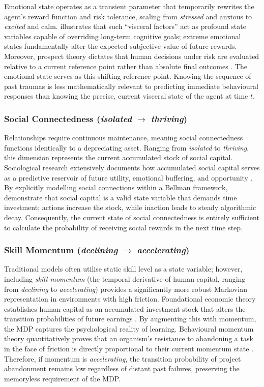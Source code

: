 \documentclass[11pt, a4paper]{article}
\begin{document}
Emotional state operates as a transient parameter that temporarily rewrites the agent's reward
function and risk tolerance, scaling from \textit{stressed} and anxious to \textit{excited}
and calm. \citet{Loewenstein1996} illustrates that such ``visceral factors'' act as profound
state variables capable of overriding long-term cognitive goals; extreme emotional states
fundamentally alter the expected subjective value of future rewards. Moreover, prospect theory
dictates that human decisions under risk are evaluated relative to a current reference point
rather than absolute final outcomes \citep{Kahneman1979}. The emotional state serves as this
shifting reference point. Knowing the sequence of past traumas is less mathematically relevant
to predicting immediate behavioural responses than knowing the precise, current visceral state
of the agent at time $t$.

\subsubsection{Social Connectedness (\textit{isolated} $\rightarrow$ \textit{thriving})}

Relationships require continuous maintenance, meaning social connectedness functions
identically to a depreciating asset. Ranging from \textit{isolated} to \textit{thriving},
this dimension represents the current accumulated stock of social capital. Sociological
research extensively documents how accumulated social capital serves as a predictive reservoir
of future utility, emotional buffering, and opportunity \citep{Putnam2000}. By explicitly
modelling social connections within a Bellman framework, \citet{Glaeser2002} demonstrate that
social capital is a valid state variable that demands time investment; actions increase the
stock, while inaction leads to steady algorithmic decay. Consequently, the current state of
social connectedness is entirely sufficient to calculate the probability of receiving social
rewards in the next time step.

\subsubsection{Skill Momentum (\textit{declining} $\rightarrow$ \textit{accelerating})}

Traditional models often utilise static skill level as a state variable; however, including
\emph{skill momentum} (the temporal derivative of human capital, ranging from
\textit{declining} to \textit{accelerating}) provides a significantly more robust Markovian
representation in environments with high friction. Foundational economic theory establishes
human capital as an accumulated investment stock that alters the transition probabilities of
future earnings \citep{Becker1962}. By augmenting this with momentum, the MDP captures the
psychological reality of learning. Behavioural momentum theory quantitatively proves that an
organism's resistance to abandoning a task in the face of friction is directly proportional to
their current momentum state \citep{Nevin1992}. Therefore, if momentum is
\textit{accelerating}, the transition probability of project abandonment remains low
regardless of distant past failures, preserving the memoryless requirement of the MDP.
\end{document}
